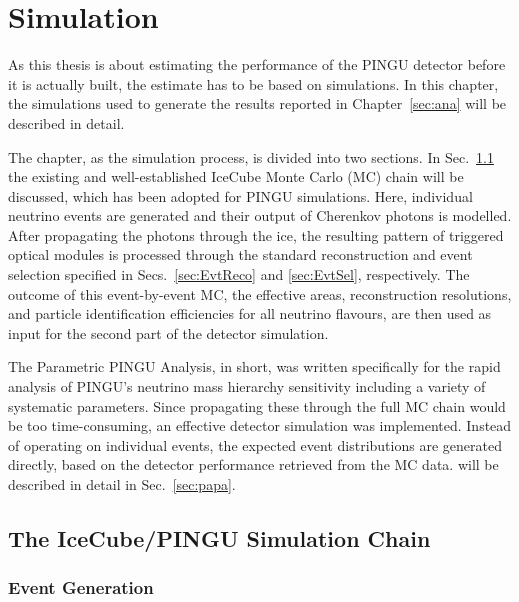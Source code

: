 \chapter{Simulation}
\label{sec:sim}

As this thesis is about estimating the performance of the PINGU detector before
it is actually built, the estimate has to be based on simulations. In this
chapter, the simulations used to generate the results reported in
Chapter~\ref{sec:ana} will be described in detail.

The chapter, as the simulation process, is divided into two sections.
In Sec.~\ref{sec:sim_MCchain} the existing and well-established IceCube Monte
Carlo (MC) chain will be discussed, which has been adopted for PINGU
simulations.
Here, individual neutrino events are generated and their output of Cherenkov
photons is modelled. After propagating the photons through the ice, the
resulting pattern of triggered optical modules is processed through the standard
reconstruction and event
selection specified in Secs.~\ref{sec:EvtReco} and \ref{sec:EvtSel},
respectively. The outcome of this event-by-event MC, \ie the effective
areas, reconstruction resolutions, and particle identification efficiencies for
all neutrino flavours, are then used as input for the second part of the
detector simulation.

The Parametric PINGU Analysis, \papa in short, was written specifically for the
rapid analysis of PINGU's neutrino mass hierarchy sensitivity including a
variety of systematic parameters. Since propagating these through the full
MC chain would be too time-consuming, an effective detector
simulation was implemented. Instead of operating on individual events,
the expected event distributions are generated directly, based on the detector
performance retrieved from the MC data. \papa will be described in
detail in Sec.~\ref{sec:papa}.

\section{The IceCube/PINGU Simulation Chain}
\label{sec:sim_MCchain}

\subsection{Event Generation}
\label{sec:MC_genie}

